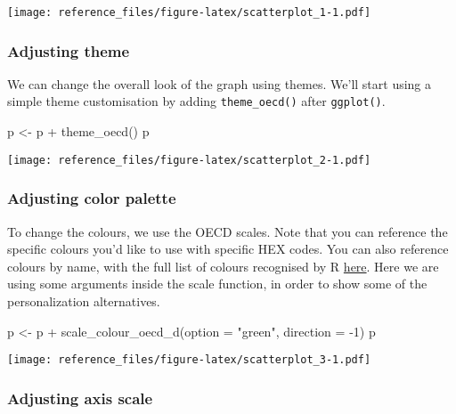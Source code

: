\documentclass[
]{article}
\newenvironment{Shaded}{\begin{snugshade}}{\end{snugshade}}
\newcommand{\AttributeTok}[1]{\textcolor[rgb]{0.77,0.63,0.00}{#1}}
\newcommand{\DecValTok}[1]{\textcolor[rgb]{0.00,0.00,0.81}{#1}}
\newcommand{\FunctionTok}[1]{\textcolor[rgb]{0.00,0.00,0.00}{#1}}
\newcommand{\NormalTok}[1]{#1}
\newcommand{\OtherTok}[1]{\textcolor[rgb]{0.56,0.35,0.01}{#1}}
\newcommand{\SpecialCharTok}[1]{\textcolor[rgb]{0.00,0.00,0.00}{#1}}
\newcommand{\StringTok}[1]{\textcolor[rgb]{0.31,0.60,0.02}{#1}}
\begin{document}
\texttt{[image: reference\_files/figure-latex/scatterplot\_1-1.pdf]}

\hypertarget{adjusting-theme-1}{%
\subsubsection{Adjusting theme}\label{adjusting-theme-1}}

We can change the overall look of the graph using themes. We'll start
using a simple theme customisation by adding \texttt{theme\_oecd()}
after \texttt{ggplot()}.

\begin{Shaded}
\begin{Highlighting}[]
\NormalTok{p }\OtherTok{\textless{}{-}}\NormalTok{ p }\SpecialCharTok{+} 
  \FunctionTok{theme\_oecd}\NormalTok{()}
\NormalTok{p}
\end{Highlighting}
\end{Shaded}

\texttt{[image: reference\_files/figure-latex/scatterplot\_2-1.pdf]}

\hypertarget{adjusting-color-palette-1}{%
\subsubsection{Adjusting color
palette}\label{adjusting-color-palette-1}}

To change the colours, we use the OECD scales. Note that you can
reference the specific colours you'd like to use with specific HEX
codes. You can also reference colours by name, with the full list of
colours recognised by R
\href{http://www.stat.columbia.edu/~tzheng/files/Rcolor.pdf}{here}. Here
we are using some arguments inside the scale function, in order to show
some of the personalization alternatives.

\begin{Shaded}
\begin{Highlighting}[]
\NormalTok{p }\OtherTok{\textless{}{-}}\NormalTok{ p }\SpecialCharTok{+}
  \FunctionTok{scale\_colour\_oecd\_d}\NormalTok{(}\AttributeTok{option =} \StringTok{"green"}\NormalTok{, }\AttributeTok{direction =} \SpecialCharTok{{-}}\DecValTok{1}\NormalTok{)}
\NormalTok{p}
\end{Highlighting}
\end{Shaded}

\texttt{[image: reference\_files/figure-latex/scatterplot\_3-1.pdf]}

\hypertarget{adjusting-axis-scale-1}{%
\subsubsection{Adjusting axis scale}\label{adjusting-axis-scale-1}}
\end{document}
